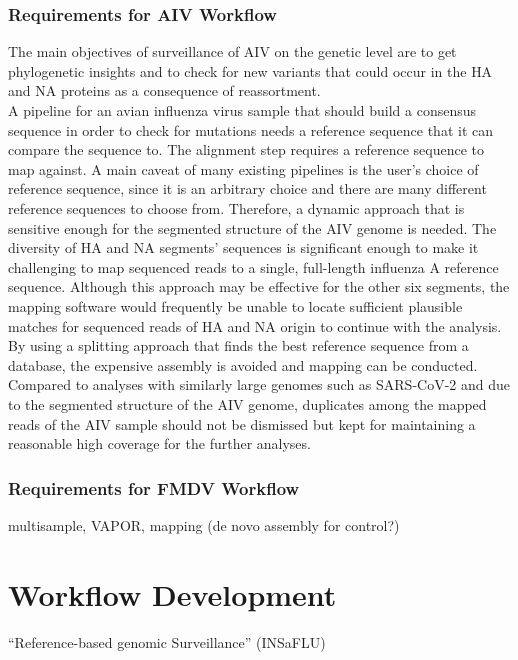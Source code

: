 \subsubsection{Requirements for \ac{AIV} Workflow}
The main objectives of surveillance of \ac{AIV} on the genetic level are to get phylogenetic insights and to check for new variants that could occur in the \ac{HA} and \ac{NA} proteins as a consequence of reassortment. \\
A pipeline for an avian influenza virus sample that should build a consensus sequence in order to check for mutations needs a reference sequence that it can compare the sequence to. The alignment step requires a reference sequence to map against. A main caveat of many existing pipelines is the user's choice of reference sequence, since it is an arbitrary choice and there are many different reference sequences to choose from. Therefore, a dynamic approach that is sensitive enough for the segmented structure of the \ac{AIV} genome is needed. The diversity of \ac{HA} and \ac{NA} segments' sequences is significant enough to make it challenging to map sequenced reads to a single, full-length influenza A reference sequence. Although this approach may be effective for the other six segments, the mapping software would frequently be unable to locate sufficient plausible matches for sequenced reads of \ac{HA} and \ac{NA} origin to continue with the analysis. By using a splitting approach that finds the best reference sequence from a database, the expensive assembly is avoided and mapping can be conducted. \\
Compared to analyses with similarly large genomes such as \ac{SARS-CoV-2} and due to the segmented structure of the \ac{AIV} genome, duplicates among the mapped reads of the \ac{AIV} sample should not be dismissed but kept for maintaining a reasonable high coverage for the further analyses. 

\subsubsection{Requirements for FMDV Workflow}
multisample, VAPOR, mapping (de novo assembly for control?)

\section{Workflow Development}
``Reference-based genomic Surveillance'' (\ac{INSaFLU})

